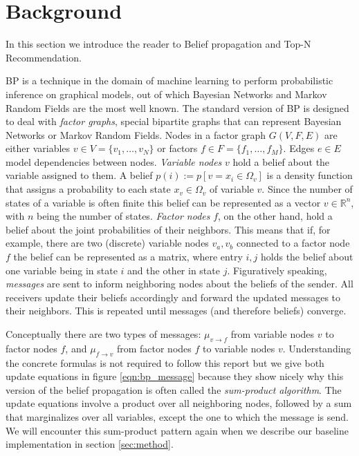 \section{Background}\label{sec:background}

In this section we introduce the reader to Belief propagation and Top-N Recommendation.

BP is a technique in the domain of machine learning to perform probabilistic inference on graphical models, out of which Bayesian Networks and Mar\-kov Random Fields are the most well known. The standard version of BP is designed to deal with \textit{factor graphs}, special bipartite graphs that can represent Bayesian Networks or Markov Random Fields. Nodes in a factor graph $G(V,F,E)$ are either variables $v \in V = \{ v_1, \ldots, v_N \}$ or factors $f \in F = \{f_1, \ldots, f_M \}$. Edges $e\in E$ model dependencies between nodes.
\textit{Variable nodes} $v$ hold a belief about the variable assigned to them. A belief $p(i):=p[v=x_i\in\Omega_{v}]$ is a density function that assigns a probability to each state $x_v \in \Omega_v$ of variable $v$. Since the number of states of a variable is often finite this belief can be represented as a vector $v \in \mathbb{R}^n$, with $n$ being the number of states. 
\textit{Factor nodes} $f$, on the other hand, hold a belief about the joint probabilities of their neighbors. 
This means that if, for example, there are two (discrete) variable nodes $v_a, v_b$ connected to a factor node $f$ the belief can be represented as a matrix, where entry $i,j$ holds the belief about one variable being in state $i$  and the other in state $j$. Figuratively speaking, \textit{messages} are sent to inform neighboring nodes about the beliefs of the sender. All receivers update their beliefs accordingly and forward the updated messages to their neighbors. This is repeated until messages (and therefore beliefs) converge. 

Conceptually there are two types of messages: $\mu_{v\rightarrow f}$ from variable nodes $v$ to factor nodes $f$, and $\mu_{f\rightarrow v}$ from factor nodes $f$ to variable nodes $v$. Understanding the concrete formulas is not required to follow this report but we give both update equations in figure \ref{eqn:bp_message} because they show nicely why this version of the belief propagation is often called the \textit{sum-product algorithm}. The update equations involve a product over all neighboring nodes, followed by a sum that marginalizes over all variables, except  the one to which the message is send. We will encounter this sum-product pattern again when we describe our baseline implementation in section \ref{sec:method}.

